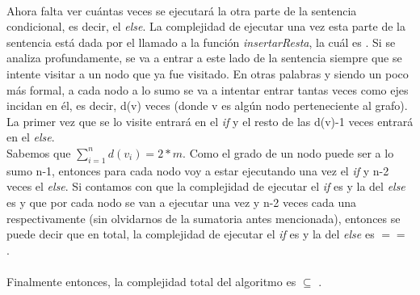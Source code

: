 \paragraph{}
Ahora falta ver cuántas veces se ejecutará la otra parte de la sentencia condicional, es decir, el  \textit{else}. La complejidad de ejecutar una vez esta parte de la sentencia está dada por el llamado a la función \textit{insertarResta}, la cuál es . Si se analiza profundamente, se va a entrar a este lado de la sentencia siempre que se intente visitar a un nodo que ya fue visitado. En otras palabras y siendo un poco más formal, a cada nodo a lo sumo se va a intentar entrar tantas veces como ejes incidan en él, es decir, d(v) veces (donde v es algún nodo perteneciente al grafo). La primer vez que se lo visite entrará en el \textit{if} y el resto de las d(v)-1 veces entrará en el \textit{else}.\\
Sabemos que $\sum_{i=1}^{n} d(v_i) = 2*m$. Como el grado de un nodo puede ser a lo sumo n-1, entonces para cada nodo voy a estar ejecutando una vez el \textit{if} y n-2 veces el \textit{else}. Si contamos con que la complejidad de ejecutar el \textit{if} es  y la del \textit{else} es  y que por cada nodo se van a ejecutar una vez y n-2 veces cada una respectivamente (sin olvidarnos de la sumatoria antes mencionada), entonces se puede decir que en total, la complejidad de ejecutar el \textit{if} es  y la del \textit{else} es  $==$ .

\paragraph{}
Finalmente entonces, la complejidad total del algoritmo es  $\subseteq$ .

